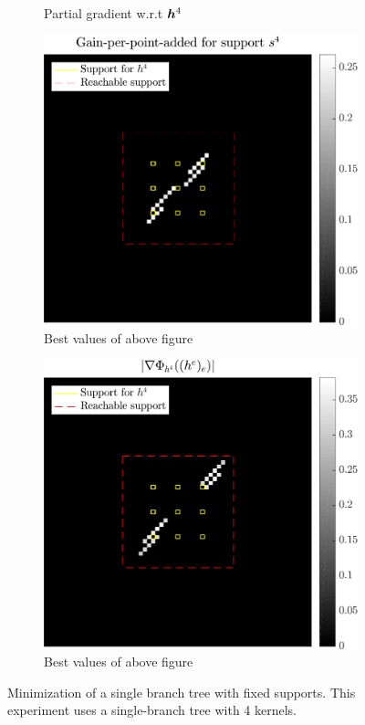 \begin{figure}[!ht]
\begin{subfigure}[b]{0.49\linewidth}
\caption{Partial gradient w.r.t $\bm{h}^4$}
\end{subfigure}
\begin{subfigure}[b]{0.49\linewidth}\centering
\includegraphics[width=\linewidth]{figures/xp/n4/xp_128x128_sc2_angl1_K3_S3_node4_objmatrix_bestvalues.pdf}
\caption{Best values of above figure}
\end{subfigure}
\begin{subfigure}[b]{0.49\linewidth}\centering
\includegraphics[width=\linewidth]{figures/xp/n4/xp_128x128_sc2_angl1_K3_S3_node4_partgrad4_bestvalues.pdf}
\caption{Best values of above figure}
\end{subfigure}
\caption{Minimization of a single branch tree with fixed supports. This experiment uses a single-branch tree with 4 kernels.}\label{fig_gain_n4}
\end{figure}


